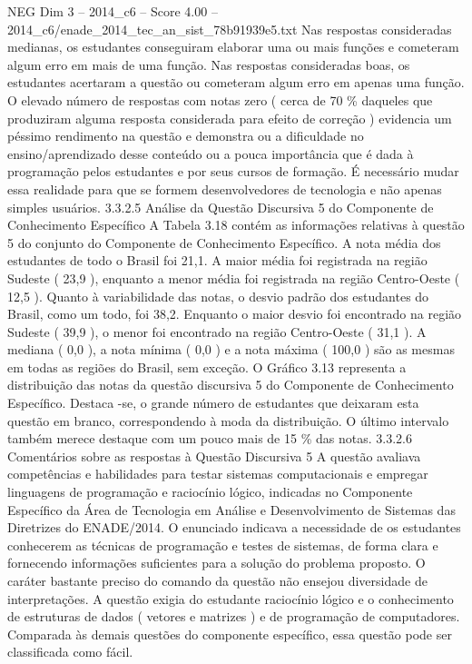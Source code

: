 \begin{textsample}{NEG Dim 3 – 2014\_c6 – Score 4.00 – 2014\_c6/enade\_2014\_tec\_an\_sist\_78b91939e5.txt}
Nas respostas consideradas medianas, os estudantes conseguiram elaborar uma ou mais funções e cometeram algum erro em mais de uma função.
Nas respostas consideradas boas, os estudantes acertaram a questão ou cometeram algum erro em apenas uma função.
O elevado número de respostas com notas zero ( cerca de 70 \% daqueles que produziram alguma resposta considerada para efeito de correção ) evidencia um péssimo rendimento na questão e demonstra ou a dificuldade no ensino/aprendizado desse conteúdo ou a pouca importância que é dada à programação pelos estudantes e por seus cursos de formação.
É necessário mudar essa realidade para que se formem desenvolvedores de tecnologia e não apenas simples usuários. 3.3.2.5 Análise da Questão Discursiva 5 do Componente de Conhecimento Específico A Tabela 3.18 contém as informações relativas à questão 5 do conjunto do Componente de Conhecimento Específico.
A nota média dos estudantes de todo o Brasil foi 21,1.
A maior média foi registrada na região Sudeste ( 23,9 ), enquanto a menor média foi registrada na região Centro-Oeste ( 12,5 ).
Quanto à variabilidade das notas, o desvio padrão dos estudantes do Brasil, como um todo, foi 38,2.
Enquanto o maior desvio foi encontrado na região Sudeste ( 39,9 ), o menor foi encontrado na região Centro-Oeste ( 31,1 ).
A mediana ( 0,0 ), a nota mínima ( 0,0 ) e a nota máxima ( 100,0 ) são as mesmas em todas as regiões do Brasil, sem exceção.
O Gráfico 3.13 representa a distribuição das notas da questão discursiva 5 do Componente de Conhecimento Específico.
Destaca -se, o grande número de estudantes que deixaram esta questão em branco, correspondendo à moda da distribuição.
O último intervalo também merece destaque com um pouco mais de 15 \% das notas. 3.3.2.6 Comentários sobre as respostas à Questão Discursiva 5 A questão avaliava competências e habilidades para testar sistemas computacionais e empregar linguagens de programação e raciocínio lógico, indicadas no Componente Específico da Área de Tecnologia em Análise e Desenvolvimento de Sistemas das Diretrizes do ENADE/2014.
O enunciado indicava a necessidade de os estudantes conhecerem as técnicas de programação e testes de sistemas, de forma clara e fornecendo informações suficientes para a solução do problema proposto.
O caráter bastante preciso do comando da questão não ensejou diversidade de interpretações.
A questão exigia do estudante raciocínio lógico e o conhecimento de estruturas de dados ( vetores e matrizes ) e de programação de computadores.
Comparada às demais questões do componente específico, essa questão pode ser classificada como fácil.

\end{textsample}

